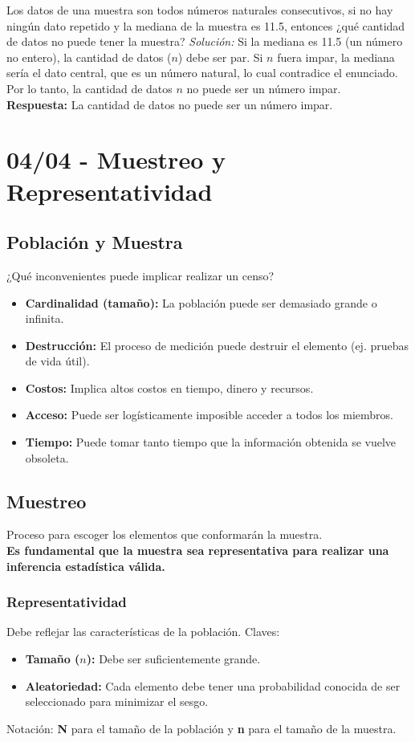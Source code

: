 \documentclass[12pt, letterpaper]{article}
\begin{document}
\vspace{1em}
\noindent Los datos de una muestra son todos números naturales consecutivos, si no hay ningún dato repetido y la mediana de la muestra es 11.5, entonces ¿qué cantidad de datos no puede tener la muestra?
\textit{Solución:}
Si la mediana es 11.5 (un número no entero), la cantidad de datos ($n$) debe ser par. Si $n$ fuera impar, la mediana sería el dato central, que es un número natural, lo cual contradice el enunciado.
Por lo tanto, la cantidad de datos $n$ no puede ser un número impar. \\
\textbf{Respuesta:} La cantidad de datos no puede ser un número impar.
\newpage

\section{04/04 - Muestreo y Representatividad}
\subsection{Población y Muestra}
¿Qué inconvenientes puede implicar realizar un censo?
\begin{itemize}
	\item \textbf{Cardinalidad (tamaño):} La población puede ser demasiado grande o infinita.
	\item \textbf{Destrucción:} El proceso de medición puede destruir el elemento (ej. pruebas de vida útil).
	\item \textbf{Costos:} Implica altos costos en tiempo, dinero y recursos.
	\item \textbf{Acceso:} Puede ser logísticamente imposible acceder a todos los miembros.
	\item \textbf{Tiempo:} Puede tomar tanto tiempo que la información obtenida se vuelve obsoleta.
\end{itemize}

\subsection{Muestreo}
Proceso para escoger los elementos que conformarán la muestra. \\
\textbf{Es fundamental que la muestra sea representativa para realizar una inferencia estadística válida.}

\subsubsection{Representatividad}
Debe reflejar las características de la población. Claves:
\begin{itemize}
	\item \textbf{Tamaño ($n$):} Debe ser suficientemente grande.
	\item \textbf{Aleatoriedad:} Cada elemento debe tener una probabilidad conocida de ser seleccionado para minimizar el sesgo.
\end{itemize}
Notación: \textbf{N} para el tamaño de la población y \textbf{n} para el tamaño de la muestra.
\end{document}
